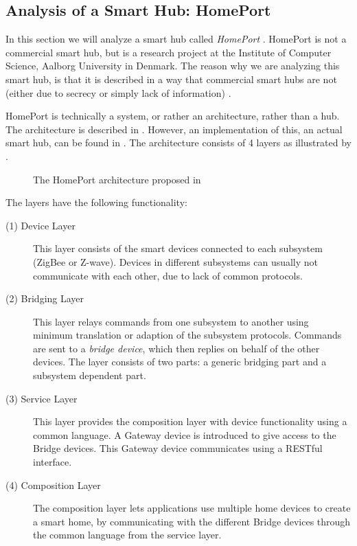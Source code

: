 \subsection{Analysis of a Smart Hub: HomePort}\label{sec:homeport}
In this section we will analyze a smart hub called \emph{HomePort} \cite{HOMEPORT10}.
HomePort is not a commercial smart hub, 
but is a research project at the Institute of Computer Science, Aalborg University in Denmark. 
The reason why we are analyzing this smart hub, 
is that it is described in a way that commercial smart hubs are not (either due to secrecy or simply lack of information) \cite{HOMEPORT09, HOMEPORT10, HOMEPORT13}.  

HomePort is technically a system, or rather an architecture, rather than a hub. 
The architecture is described in \cite{HOMEPORT10}. 
However, an implementation of this, \ie an actual smart hub, can be found in \cite{HOMEPORT13}. 
The architecture consists of \num{4} layers as illustrated by .

\begin{figure}[!htb]
    \centering
    
    \caption{The HomePort architecture proposed in \protect\cite{HOMEPORT10}}
    \label{fig:homeport}
\end{figure}

The layers have the following functionality:
\begin{description}
    \item[(1) Device Layer] This layer consists of the smart devices connected to each subsystem (\eg ZigBee or Z-wave). Devices in different subsystems can usually not communicate with each other, due to lack of common protocols. 
    \item[(2) Bridging Layer] This layer relays commands from one subsystem to another using minimum translation or adaption of the subsystem protocols. Commands are sent to a \emph{bridge device}, which then replies on behalf of the other devices. The layer consists of two parts: a generic bridging part and a subsystem dependent part. 
    \item[(3) Service Layer] This layer provides the composition layer with device functionality using a common language. A Gateway device is introduced to give access to the Bridge devices. This Gateway device communicates using a RESTful interface. 
    \item[(4) Composition Layer] The composition layer lets applications use multiple home devices to create a smart home, by communicating with the different Bridge devices through the common language from the service layer. 
\end{description}


